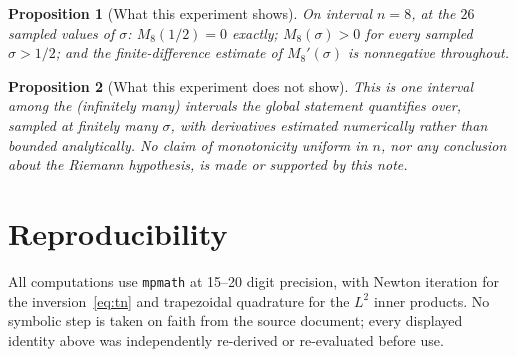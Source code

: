 \documentclass[11pt]{amsart}
\newtheorem{proposition}{Proposition}
\begin{document}
\begin{proposition}[What this experiment shows]
On interval $n=8$, at the $26$ sampled values of $\sigma$: $M_8(1/2)=0$
exactly; $M_8(\sigma)>0$ for every sampled $\sigma>1/2$; and the
finite-difference estimate of $M_8'(\sigma)$ is nonnegative throughout.
\end{proposition}

\begin{proposition}[What this experiment does not show]
This is one interval among the (infinitely many) intervals the global
statement quantifies over, sampled at finitely many $\sigma$, with
derivatives estimated numerically rather than bounded analytically.
No claim of monotonicity uniform in $n$, nor any conclusion about the
Riemann hypothesis, is made or supported by this note.
\end{proposition}

\section{Reproducibility}

All computations use \texttt{mpmath} at 15--20 digit precision, with
Newton iteration for the inversion~\eqref{eq:tn} and trapezoidal
quadrature for the $L^2$ inner products. No symbolic step is taken on
faith from the source document; every displayed identity above was
independently re-derived or re-evaluated before use.
\end{document}

